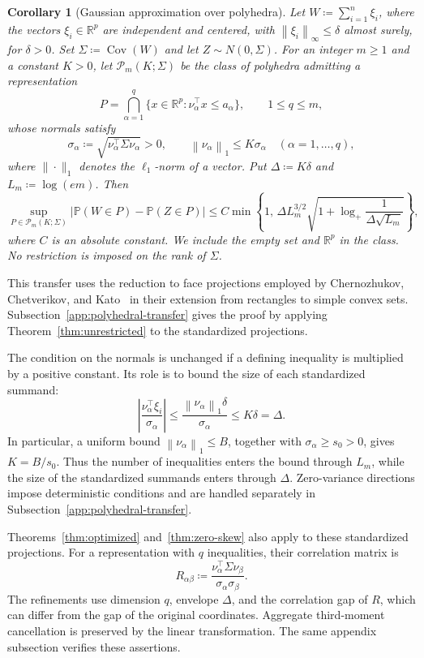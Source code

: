 \documentclass[11pt,letterpaper]{article}
\newtheorem{corollary}{Corollary}
\theoremstyle{remark}
\newcommand{\Pp}{\mathbb P}
\newcommand{\R}{\mathbb R}
\newcommand{\Cov}{\operatorname{Cov}}
\newcommand{\norm}[1]{\left\lVert#1\right\rVert}
\begin{document}
\begin{corollary}[Gaussian approximation over polyhedra]\label{cor:polyhedra}
Let \(W\coloneqq\sum_{i=1}^n\xi_i\), where the vectors
\(\xi_i\in\R^p\) are independent and centered, with
\(\norm{\xi_i}_\infty\le\delta\) almost surely, for \(\delta>0\).
Set \(\Sigma\coloneqq\Cov(W)\) and let \(Z\sim N(0,\Sigma)\).
For an integer \(m\ge1\) and a constant \(K>0\), let
\(\mathcal P_m(K;\Sigma)\) be the class of polyhedra admitting a
representation
\[
 P=\bigcap_{\alpha=1}^q
 \{x\in\R^p:\nu_\alpha^\top x\le a_\alpha\},
 \qquad 1\le q\le m,
\]
whose normals satisfy
\[
 \sigma_\alpha\coloneqq
 \sqrt{\nu_\alpha^\top\Sigma\nu_\alpha}>0,
 \qquad \norm{\nu_\alpha}_1\le K\sigma_\alpha
 \quad(\alpha=1,\ldots,q),
\]
where $\|\cdot\|_1$ denotes the $\ell_1$-norm of a vector. 
Put \(\Delta\coloneqq K\delta\) and \(L_m\coloneqq\log(em)\).
Then
\[
 \sup_{P\in\mathcal P_m(K;\Sigma)}
 |\Pp(W\in P)-\Pp(Z\in P)|
 \le C\min\!\left\{1,\,
 \Delta L_m^{3/2}
 \sqrt{1+\log_+\frac1{\Delta\sqrt{L_m}}}\right\},
\]
where \(C\) is an absolute constant. We include the empty set and
\(\R^p\) in the class. No restriction is imposed on the
rank of \(\Sigma\).
\end{corollary}

This transfer uses the reduction to face projections employed by
Chernozhukov, Chetverikov, and Kato~\cite[Section~3.1 and the proof of
Proposition~3.1]{CCK2017} in their extension from rectangles to simple
convex sets. Subsection~\ref{app:polyhedral-transfer} gives the proof
by applying Theorem~\ref{thm:unrestricted} to the standardized
projections.

The condition on the normals is unchanged if a defining inequality
is multiplied by a positive constant. Its role is to bound the size
of each standardized summand:
\[
 \left|\frac{\nu_\alpha^\top\xi_i}{\sigma_\alpha}\right|
 \le\frac{\norm{\nu_\alpha}_1\delta}{\sigma_\alpha}
 \le K\delta=\Delta.
\]
In particular, a uniform bound \(\norm{\nu_\alpha}_1\le B\),
together with \(\sigma_\alpha\ge s_0>0\), gives \(K=B/s_0\).
Thus the number of inequalities enters the bound through \(L_m\),
while the size of the standardized summands enters through \(\Delta\).
Zero-variance directions impose deterministic conditions and are
handled separately in Subsection~\ref{app:polyhedral-transfer}.

Theorems~\ref{thm:optimized} and~\ref{thm:zero-skew} also apply to
these standardized projections. For a representation with \(q\)
inequalities, their correlation matrix is
\[
 R_{\alpha\beta}\coloneqq
 \frac{\nu_\alpha^\top\Sigma\nu_\beta}
      {\sigma_\alpha\sigma_\beta}.
\]
The refinements use dimension \(q\), envelope \(\Delta\), and the
correlation gap of \(R\), which can differ from the gap of the
original coordinates. Aggregate third-moment cancellation is
preserved by the linear transformation. The same appendix subsection
verifies these assertions.
\end{document}
